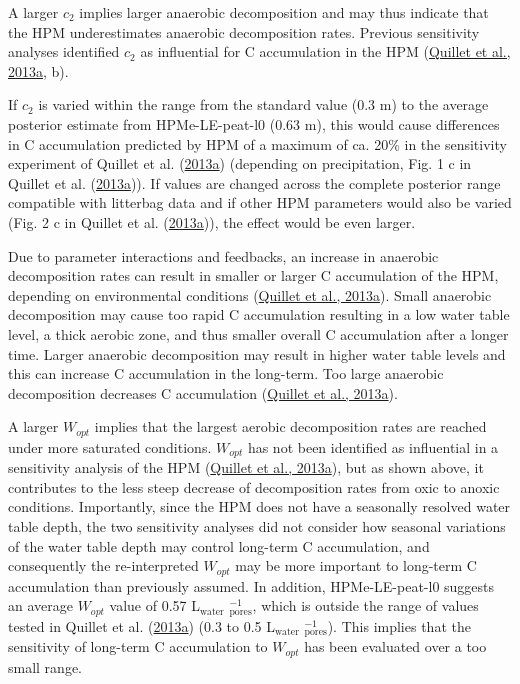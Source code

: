 \documentclass[
  12pt,
]{article}
\begin{document}
A larger \(c_2\) implies larger anaerobic decomposition and may thus indicate that the HPM underestimates anaerobic decomposition rates. Previous sensitivity analyses identified \(c_2\) as influential for C accumulation in the HPM (\protect\hyperlink{ref-Quillet.2013}{Quillet et al., 2013a}, b).

If \(c_2\) is varied within the range from the standard value (0.3 m) to the average posterior estimate from HPMe-LE-peat-l0 (0.63 m), this would cause differences in C accumulation predicted by HPM of a maximum of ca. 20\% in the sensitivity experiment of Quillet et al. (\protect\hyperlink{ref-Quillet.2013}{2013a}) (depending on precipitation, Fig. 1 c in Quillet et al. (\protect\hyperlink{ref-Quillet.2013}{2013a})). If values are changed across the complete posterior range compatible with litterbag data and if other HPM parameters would also be varied (Fig. 2 c in Quillet et al. (\protect\hyperlink{ref-Quillet.2013}{2013a})), the effect would be even larger.

Due to parameter interactions and feedbacks, an increase in anaerobic decomposition rates can result in smaller or larger C accumulation of the HPM, depending on environmental conditions (\protect\hyperlink{ref-Quillet.2013}{Quillet et al., 2013a}). Small anaerobic decomposition may cause too rapid C accumulation resulting in a low water table level, a thick aerobic zone, and thus smaller overall C accumulation after a longer time. Larger anaerobic decomposition may result in higher water table levels and this can increase C accumulation in the long-term. Too large anaerobic decomposition decreases C accumulation (\protect\hyperlink{ref-Quillet.2013}{Quillet et al., 2013a}).

A larger \(W_{opt}\) implies that the largest aerobic decomposition rates are reached under more saturated conditions. \(W_{opt}\) has not been identified as influential in a sensitivity analysis of the HPM (\protect\hyperlink{ref-Quillet.2013}{Quillet et al., 2013a}), but as shown above, it contributes to the less steep decrease of decomposition rates from oxic to anoxic conditions. Importantly, since the HPM does not have a seasonally resolved water table depth, the two sensitivity analyses did not consider how seasonal variations of the water table depth may control long-term C accumulation, and consequently the re-interpreted \(W_{opt}\) may be more important to long-term C accumulation than previously assumed. In addition, HPMe-LE-peat-l0 suggests an average \(W_{opt}\) value of 0.57 L\(_\text{water}\) \(_\text{pores}^{-1}\), which is outside the range of values tested in Quillet et al. (\protect\hyperlink{ref-Quillet.2013}{2013a}) (0.3 to 0.5 L\(_\text{water}\) \(_\text{pores}^{-1}\)). This implies that the sensitivity of long-term C accumulation to \(W_{opt}\) has been evaluated over a too small range.
\end{document}
